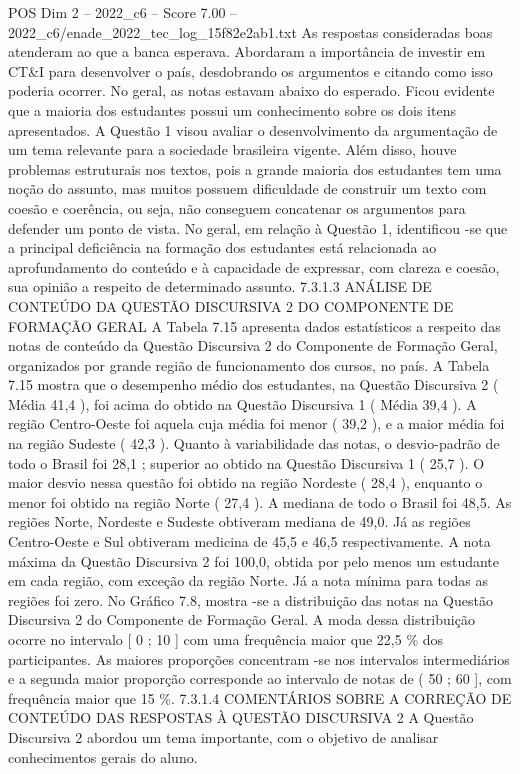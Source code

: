 \begin{textsample}{POS Dim 2 – 2022\_c6 – Score 7.00 – 2022\_c6/enade\_2022\_tec\_log\_15f82e2ab1.txt}
As respostas consideradas boas atenderam ao que a banca esperava.
Abordaram a importância de investir em CT\&I para desenvolver o país, desdobrando os argumentos e citando como isso poderia ocorrer.
No geral, as notas estavam abaixo do esperado.
Ficou evidente que a maioria dos estudantes possui um conhecimento sobre os dois itens apresentados.
A Questão 1 visou avaliar o desenvolvimento da argumentação de um tema relevante para a sociedade brasileira vigente.
Além disso, houve problemas estruturais nos textos, pois a grande maioria dos estudantes tem uma noção do assunto, mas muitos possuem dificuldade de construir um texto com coesão e coerência, ou seja, não conseguem concatenar os argumentos para defender um ponto de vista.
No geral, em relação à Questão 1, identificou -se que a principal deficiência na formação dos estudantes está relacionada ao aprofundamento do conteúdo e à capacidade de expressar, com clareza e coesão, sua opinião a respeito de determinado assunto. 7.3.1.3 ANÁLISE DE CONTEÚDO DA QUESTÃO DISCURSIVA 2 DO COMPONENTE DE FORMAÇÃO GERAL A Tabela 7.15 apresenta dados estatísticos a respeito das notas de conteúdo da Questão Discursiva 2 do Componente de Formação Geral, organizados por grande região de funcionamento dos cursos, no país.
A Tabela 7.15 mostra que o desempenho médio dos estudantes, na Questão Discursiva 2 ( Média 41,4 ), foi acima do obtido na Questão Discursiva 1 ( Média 39,4 ).
A região Centro-Oeste foi aquela cuja média foi menor ( 39,2 ), e a maior média foi na região Sudeste ( 42,3 ).
Quanto à variabilidade das notas, o desvio-padrão de todo o Brasil foi 28,1 ; superior ao obtido na Questão Discursiva 1 ( 25,7 ).
O maior desvio nessa questão foi obtido na região Nordeste ( 28,4 ), enquanto o menor foi obtido na região Norte ( 27,4 ).
A mediana de todo o Brasil foi 48,5.
As regiões Norte, Nordeste e Sudeste obtiveram mediana de 49,0.
Já as regiões Centro-Oeste e Sul obtiveram medicina de 45,5 e 46,5 respectivamente.
A nota máxima da Questão Discursiva 2 foi 100,0, obtida por pelo menos um estudante em cada região, com exceção da região Norte.
Já a nota mínima para todas as regiões foi zero.
No Gráfico 7.8, mostra -se a distribuição das notas na Questão Discursiva 2 do Componente de Formação Geral.
A moda dessa distribuição ocorre no intervalo [ 0 ; 10 ] com uma frequência maior que 22,5 \% dos participantes.
As maiores proporções concentram -se nos intervalos intermediários e a segunda maior proporção corresponde ao intervalo de notas de ( 50 ; 60 ], com frequência maior que 15 \%. 7.3.1.4 COMENTÁRIOS SOBRE A CORREÇÃO DE CONTEÚDO DAS RESPOSTAS À QUESTÃO DISCURSIVA 2 A Questão Discursiva 2 abordou um tema importante, com o objetivo de analisar conhecimentos gerais do aluno.

\end{textsample}
